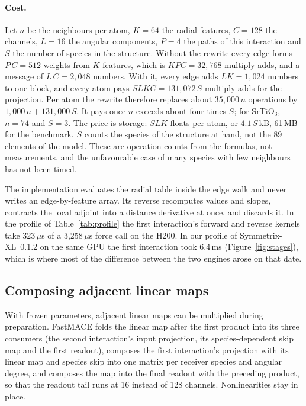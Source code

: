 \documentclass[11pt]{article}
\newcommand{\us}{\,\ensuremath{\mu}s}
\newcommand{\ms}{\,ms}
\begin{document}
\paragraph{Cost.}
Let $n$ be the neighbours per atom, $K = 64$ the radial features, $C = 128$ the channels, $L = 16$ the angular
components, $P = 4$ the paths of this interaction and $S$ the number of species in the structure. Without the
rewrite every edge forms $P\,C = 512$ weights from $K$ features, which is $K P C = 32{,}768$ multiply-adds, and a
message of $L\,C = 2{,}048$ numbers. With it, every edge adds $L K = 1{,}024$ numbers to one block, and every
atom pays $S L K C = 131{,}072\,S$ multiply-adds for the projection. Per atom the rewrite therefore replaces about
$35{,}000\,n$ operations by $1{,}000\,n + 131{,}000\,S$. It pays once $n$ exceeds about four times $S$; for
SrTiO$_3$, $n = 74$ and $S = 3$. The price is storage: $S L K$ floats per atom, or $4.1\,S$\,kB, 61\,MB for the
benchmark. $S$ counts the species of the structure at hand, not the 89 elements of the model. These are
operation counts from the formulas, not measurements, and the unfavourable case of many species with few
neighbours has not been timed.

The implementation evaluates the radial table inside the edge walk and never writes an edge-by-feature array. Its
reverse recomputes values and slopes, contracts the local adjoint into a distance derivative at once, and
discards it. In the profile of Table~\ref{tab:profile} the first interaction's forward and reverse kernels take
323\us{} of a 3{,}258\us{} force call on the H200. In our profile of Symmetrix-XL~0.1.2 on the same GPU the
first interaction took 6.4\ms{} (Figure~\ref{fig:stages}), which is where most of the difference between the two
engines arose on that date.

\subsection{Composing adjacent linear maps}

With frozen parameters, adjacent linear maps can be multiplied during preparation. FastMACE folds the linear map
after the first product into its three consumers (the second interaction's input projection, its
species-dependent skip map and the first readout), composes the first interaction's projection with its linear
map and species skip into one matrix per receiver species and angular degree, and composes the map into the
final readout with the preceding product, so that the readout tail runs at 16 instead of 128 channels.
Nonlinearities stay in place.
\end{document}
